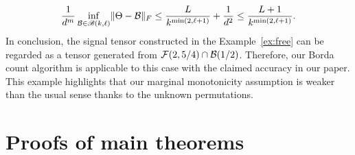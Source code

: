 \documentclass[12pt]{article}
\theoremstyle{definition}
\def\caliB{\mathscr{B}}
\begin{document}
{\[
{1\over d^m}\inf_{\tB\in\caliB(k,\ell)}\FnormSize{}{\Theta-\tB} \leq {L \over k^{\min(2,\ell+1)}}+{1\over d^2}\leq {L+1\over k^{\min(2,\ell+1)}}.
\]
In conclusion, the signal tensor constructed in the Example~\ref{ex:free} can be regarded as a tensor generated from $\mathcal{F}(2,5/4)\cap \mathcal{B}(1/2)$. 
Therefore, our Borda count algorithm is applicable to this case with the claimed accuracy in our paper. This example highlights that our marginal monotonicity assumption is weaker than the usual sense thanks to the unknown permutations. }

\section{Proofs of main theorems}\label{app:theorem}
\end{document}
